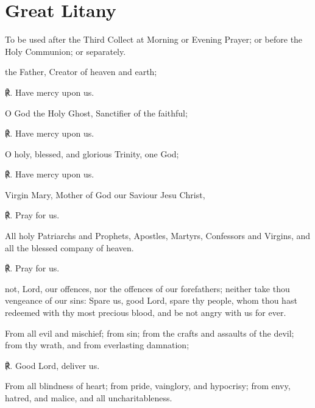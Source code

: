 \label{litany}
\fancyhead[RE,LO]{}
\section{Great Litany}
\begin{rubric}
	{To be used after the Third Collect at Morning or Evening Prayer; or before the Holy Communion; or separately.}
\end{rubric}
\begin{multicols}{2}
 the Father, Creator of heaven and earth;\par
   ℟. Have mercy upon us.
\par\noindent
   O God the Holy Ghost, Sanctifier of the faithful;

   ℟. Have mercy upon us.
   \par\noindent
   O holy, blessed, and glorious Trinity, one God;
   
   ℟. Have mercy upon us.
   \par\noindent
   Virgin Mary, Mother of God our Saviour Jesu Christ,\par
℟. Pray for us.\par\noindent
  All holy Patriarchs and Prophets, Apostles, Martyrs, Confessors and Virgins, and all the blessed company of heaven.\par
℟. Pray for us.
  \par\noindent
    not, Lord, our offences, nor the offences of our forefathers; neither take thou vengeance of our sins: Spare us, good Lord, spare thy people, whom thou hast redeemed with thy most precious blood, and be not angry with us for ever.\par  
   \par\noindent
    From all evil and mischief; from sin; from the crafts and assaults of the devil; from thy wrath, and from everlasting damnation;
    
    ℟. Good Lord, deliver us.
    \par\noindent
    From all blindness of heart; from pride, vainglory, and hypocrisy; from envy, hatred, and malice, and all uncharitableness.
    

\end{multicols}
